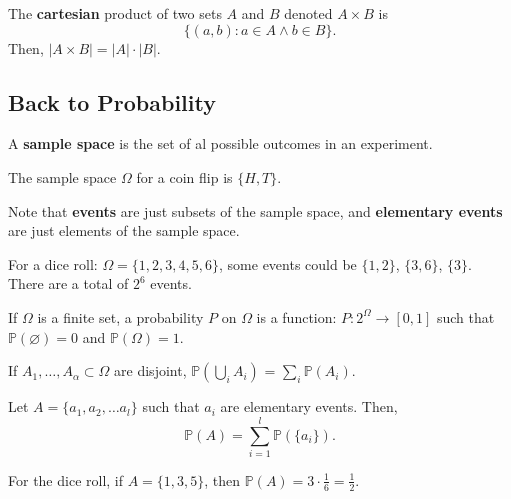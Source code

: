 \begin{definition}
	The \textbf{cartesian} product of two sets \( A \) and \( B \) denoted \( A \times B \) is \[
		\{(a,b) \colon a \in A \land b \in B\}  
	.\] 
	Then, \( |A \times B| = |A| \cdot |B| \).
\end{definition}

\subsection{Back to Probability}

\begin{definition}
	A \textbf{sample space} is the set of al possible outcomes in an experiment.
\end{definition}

\begin{eg}
	The sample space \( \Omega  \) for a coin flip is \( \{H,T\}   \).
\end{eg}

Note that \textbf{events} are just subsets of the sample space, and \textbf{elementary events} are just elements of the sample space.

\begin{eg}
	For a dice roll:	\( \Omega =\{1,2,3,4,5,6\}   \), some events could be \( \{1,2\}   \), \( \{3,6\}   \), \( \{3\}   \). There are a total of \( 2^6 \) events.
\end{eg}
\begin{definition}
	If \( \Omega  \) is a finite set, a probability \( P \) on \( \Omega  \) is a function: \( P \colon 2^{\Omega } \to [0,1]    \) such that \( \mathbb{P}(\varnothing) = 0 \) and \( \mathbb{P}(\Omega )=1 \).
\end{definition}

\begin{lemma}
	If \( A_{1}, \ldots, A_{\alpha } \subset \Omega  \) are disjoint, \( \mathbb{P}(\bigcup_{i}A_i) \) = \( \sum_{i} \mathbb{P}(A_i) \).
\end{lemma}

\begin{prop}
	Let \( A = \{a_{1},a_{2},\ldots a_l\}   \) such that \( a_i \) are elementary events. Then, \[
		\mathbb{P}(A) = \sum_{i=1}^{l} \mathbb{P}(\{a_i\}  )
	.\] 
\end{prop}

\begin{eg}
	For the dice roll, if \( A=\{1,3,5\}   \), then \( \mathbb{P}(A) = 3\cdot  \frac{1}{6}= \frac{1}{2} \).
\end{eg}

